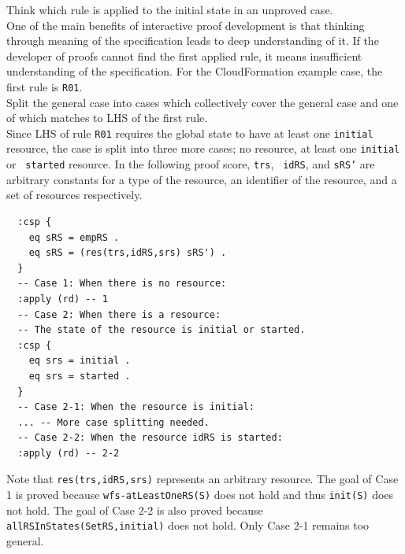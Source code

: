 \documentclass[12pt]{report}
\newcommand{\stt}[1]{{\small{\tt {#1}}}}
\begin{document}
 Think which rule is applied to the initial
state in an unproved case. \\ One of the main benefits of interactive
proof development is that thinking through meaning of the
specification leads to deep understanding of it. If the developer of
proofs cannot find the first applied rule, it means insufficient
understanding of the specification. For the CloudFormation example
case, the first rule is {\tt R01}. \\

 Split the general case into cases which
collectively cover the general case and one of which matches to LHS of
the first rule. \\ Since LHS of rule {\tt R01} requires the global
state to have at least one {\tt initial} resource, the case is split
into three more cases; no resource, at least one {\tt initial} or {\tt
  started} resource. In the following proof score, {\tt trs}, {\tt
  idRS}, and {\tt sRS'} are arbitrary constants for a type of the
resource, an identifier of the resource, and a set of resources
respectively. 
\small
\begin{verbatim}
  :csp { 
    eq sRS = empRS .
    eq sRS = (res(trs,idRS,srs) sRS') .
  }
  -- Case 1: When there is no resource:
  :apply (rd) -- 1
  -- Case 2: When there is a resource:
  -- The state of the resource is initial or started.
  :csp { 
    eq srs = initial .
    eq srs = started .
  }
  -- Case 2-1: When the resource is initial:
  ... -- More case splitting needed.
  -- Case 2-2: When the resource idRS is started:
  :apply (rd) -- 2-2
\end{verbatim}
\normalsize
Note that \stt{res(trs,idRS,srs)} represents an arbitrary resource.
The goal of Case 1 is proved because \stt{wfs-atLeastOneRS(S)} does
not hold and thus \stt{init(S)} does not hold. The goal of Case 2-2 is
also proved because \stt{allRSInStates(SetRS,initial)} does not hold.
Only Case 2-1 remains too general.\\
\end{document}
